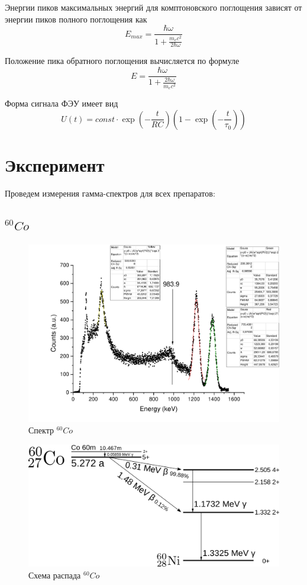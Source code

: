 \documentclass[a4paper,12pt]{article}
\begin{document}
		Энергии пиков максимальных энергий для комптоновского поглощения зависят от энергии пиков полного поглощения как
	\begin{equation}
		E_{max} = \frac{\hbar \omega}{1 + \frac{m_e c^2}{2 \hbar \omega}}
	\end{equation}
	
	Положение пика обратного поглощения вычисляется по формуле
	\begin{equation}
		E = \frac{\hbar \omega}{1 + \frac{2 \hbar \omega}{m_e c^2}}
	\end{equation}
	
	Форма сигнала ФЭУ имеет вид
	\begin{equation}
		U(t) = const \cdot \exp\left(-\frac{t}{RC}\right)\left(1 - \exp\left(-\frac{t}{\tau_0}\right)\right)
	\end{equation}
		
	\section{Эксперимент}
	    Проведем измерения гамма-спектров для всех препаратов:
	    \subsection{$^{60}Co$}
	    
	        \begin{figure}[h!]
	            	            \includegraphics[width=\linewidth]{co60.pdf}
	            \caption{Спектр $^{60}Co$}
	            \label{co60_e}
	        \end{figure}
	        
	        \begin{figure}[h!]
	            \centering
	            \includegraphics[width=0.4\linewidth]{2000px-Cobalt-60m-decay.png}
	            \caption{Схема распада $^{60}Co$}
	            \label{co60_d}
	        \end{figure}
	       
\end{document}
